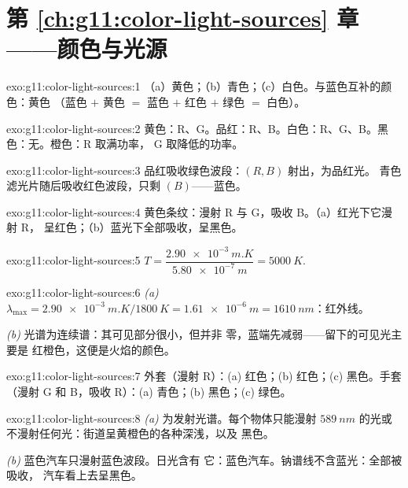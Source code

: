\section*{第 \ref{ch:g11:color-light-sources} 章——颜色与光源}

\begin{solution}{exo:g11:color-light-sources:1}
（a）黄色；（b）青色；（c）白色。与蓝色互补的颜色：黄色
（蓝色 $+$ 黄色 $=$ 蓝色 $+$ 红色 $+$ 绿色 $=$ 白色）。
\end{solution}

\begin{solution}{exo:g11:color-light-sources:2}
黄色：R、G。品红：R、B。白色：R、G、B。黑色：无。橙色：R 取满功率，
G 取降低的功率。
\end{solution}

\begin{solution}{exo:g11:color-light-sources:3}
品红吸收绿色波段：$(R, B)$ 射出，为品红光。
青色滤光片随后吸收红色波段，只剩 $(B)$——蓝色。
\end{solution}

\begin{solution}{exo:g11:color-light-sources:4}
黄色条纹：漫射 R 与 G，吸收 B。（a）红光下它漫射 R，
呈红色；（b）蓝光下全部吸收，呈黑色。
\end{solution}

\begin{solution}{exo:g11:color-light-sources:5}
$T = \dfrac{\qty{2.90e-3}{m.K}}{\qty{5.80e-7}{m}} = \qty{5000}{K}$.
\end{solution}

\begin{solution}{exo:g11:color-light-sources:6}
\emph{(a)} $\lambda_{\max} = \qty{2.90e-3}{m.K}/\qty{1800}{K}
= \qty{1.61e-6}{m} = \qty{1610}{nm}$：红外线。

\emph{(b)} 光谱为连续谱：其可见部分很小，但并非
零，蓝端先减弱——留下的可见光主要是
红橙色，这便是火焰的颜色。
\end{solution}

\begin{solution}{exo:g11:color-light-sources:7}
外套（漫射 R）：(a) 红色；(b) 红色；(c) 黑色。手套（漫射 G 和
B，吸收 R）：(a) 青色；(b) 黑色；(c) 绿色。
\end{solution}

\begin{solution}{exo:g11:color-light-sources:8}
\emph{(a)} 为发射光谱。每个物体只能漫射
$\qty{589}{nm}$ 的光或不漫射任何光：街道呈黄橙色的各种深浅，以及
黑色。

\emph{(b)} 蓝色汽车只漫射蓝色波段。日光含有
它：蓝色汽车。钠谱线不含蓝光：全部被吸收，
汽车看上去呈黑色。
\end{solution}

